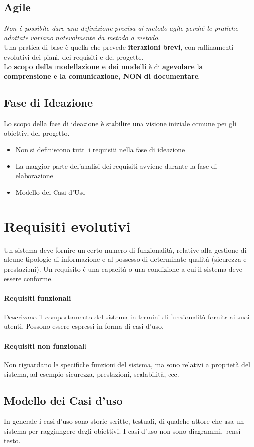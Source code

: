 \documentclass[12pt]{article}
\begin{document}
\subsection{Agile}
\textit{Non è possibile dare una definizione precisa di metodo agile perché le pratiche adottate variano notevolmente da metodo a metodo}. \\Una pratica di base è quella che prevede \textbf{iterazioni brevi}, con raffinamenti evolutivi dei piani, dei requisiti e del progetto. \\Lo \textbf{scopo della modellazione e dei modelli} è di \textbf{agevolare la comprensione e la comunicazione, NON di documentare}.
\subsection{Fase di Ideazione}
Lo scopo della fase di ideazione è stabilire una visione iniziale comune per gli obiettivi del progetto.
\begin{itemize}
    \item Non si definiscono tutti i requisiti nella fase di ideazione
    \item La maggior parte del'analisi dei requisiti avviene durante la fase di elaborazione
    \item Modello dei Casi d'Uso
\end{itemize}
\newpage
\section{Requisiti evolutivi}
Un sistema deve fornire un certo numero di funzionalità, relative alla gestione di alcune tipologie di informazione e al possesso di determinate qualità (sicurezza e prestazioni). Un requisito è una capacità o una condizione a cui il sistema deve essere conforme. 
\paragraph{Requisiti funzionali} Descrivono il comportamento del sistema in termini di funzionalità fornite ai suoi utenti. Possono essere espressi in forma di casi d'uso.
\paragraph{Requisiti non funzionali} Non riguardano le specifiche funzioni del sistema, ma sono relativi a proprietà del sistema, ad esempio sicurezza, prestazioni, scalabilità, ecc.
\subsection{Modello dei Casi d'uso}
In generale i casi d'uso sono storie scritte, testuali, di qualche attore che usa un sistema per raggiungere degli obiettivi. I casi d'uso non sono diagrammi, bensì testo.
\end{document}
